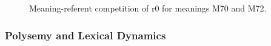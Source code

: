 \begin{figure}[t]
\centering
{}
\caption{Meaning-referent competition of r0 for meanings M70 and M72.}
\label{f:opt:mr}
\end{figure}

\subsubsection{Polysemy and Lexical Dynamics}

